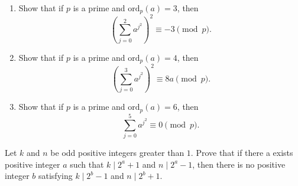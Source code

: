\documentclass{subfile}
\begin{document}
	
	\begin{problem}
		$ $
		\begin{enumerate}
			\item Show that if $p$ is a prime and $\text{ord}_p(a)=3$, then \[\left(\sum_{j=0}^{2}a^{j^{2}}\right)^{2}\equiv{-3}\pmod{p}.\]
			
			\item Show that if $p$ is a prime and $\text{ord}_p(a)=4$, then \[\left(\sum_{j=0}^{3}a^{j^{2}}\right)^{2}\equiv{8a}\pmod{p}.\]
			
			\item Show that if $p$ is a prime and $\text{ord}_p(a)=6$, then \[\sum_{j=0}^{5}a^{j^{2}}\equiv{0}\pmod{p}.\]
		\end{enumerate}
	\end{problem}
	
	
	\begin{problem}[Poland 2016]
		Let $k$ and $n$ be odd positive integers greater than $1$. Prove that if there a exists positive integer $a$ such that $k \mid 2^a+1$ and $n \mid 2^a-1$, then there is no positive integer $b$ satisfying $k \mid 2^b-1$ and  $n \mid 2^b+1$. %
	\end{problem}
	
\end{document}

